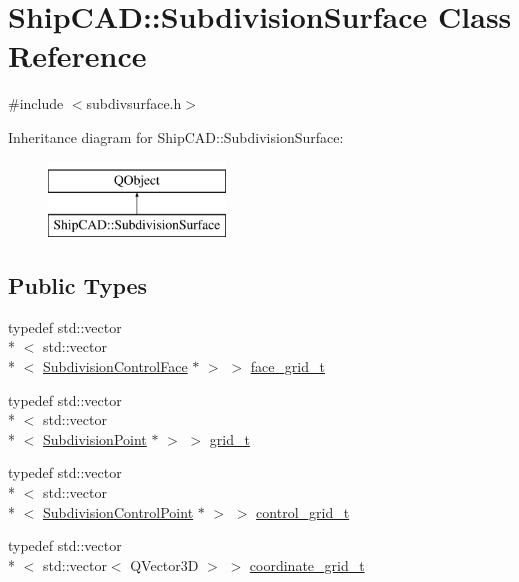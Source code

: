\hypertarget{classShipCAD_1_1SubdivisionSurface}{\section{Ship\-C\-A\-D\-:\-:Subdivision\-Surface Class Reference}
\label{classShipCAD_1_1SubdivisionSurface}
}


{\ttfamily \#include $<$subdivsurface.\-h$>$}

Inheritance diagram for Ship\-C\-A\-D\-:\-:Subdivision\-Surface\-:\begin{figure}[H]
\begin{center}
\leavevmode
\includegraphics[height=2.000000cm]{classShipCAD_1_1SubdivisionSurface}
\end{center}
\end{figure}
\subsection*{Public Types}
\begin{DoxyCompactItemize}
\item 
typedef std\-::vector\\*
$<$ std\-::vector\\*
$<$ \hyperlink{classShipCAD_1_1SubdivisionControlFace}{Subdivision\-Control\-Face} $\ast$ $>$ $>$ \hyperlink{classShipCAD_1_1SubdivisionSurface_a26a7d7b71acd662b1014ab39af4ee343}{face\-\_\-grid\-\_\-t}
\item 
typedef std\-::vector\\*
$<$ std\-::vector\\*
$<$ \hyperlink{classShipCAD_1_1SubdivisionPoint}{Subdivision\-Point} $\ast$ $>$ $>$ \hyperlink{classShipCAD_1_1SubdivisionSurface_a69d4a3ca038ee247d0abcffa6125df95}{grid\-\_\-t}
\item 
typedef std\-::vector\\*
$<$ std\-::vector\\*
$<$ \hyperlink{classShipCAD_1_1SubdivisionControlPoint}{Subdivision\-Control\-Point} $\ast$ $>$ $>$ \hyperlink{classShipCAD_1_1SubdivisionSurface_ae53cacefe98ce33992a05f941f4ff4ee}{control\-\_\-grid\-\_\-t}
\item 
typedef std\-::vector\\*
$<$ std\-::vector$<$ Q\-Vector3\-D $>$ $>$ \hyperlink{classShipCAD_1_1SubdivisionSurface_a8ed657cb7d4cd34662bd2d3e949d3e3b}{coordinate\-\_\-grid\-\_\-t}
\end{DoxyCompactItemize}
